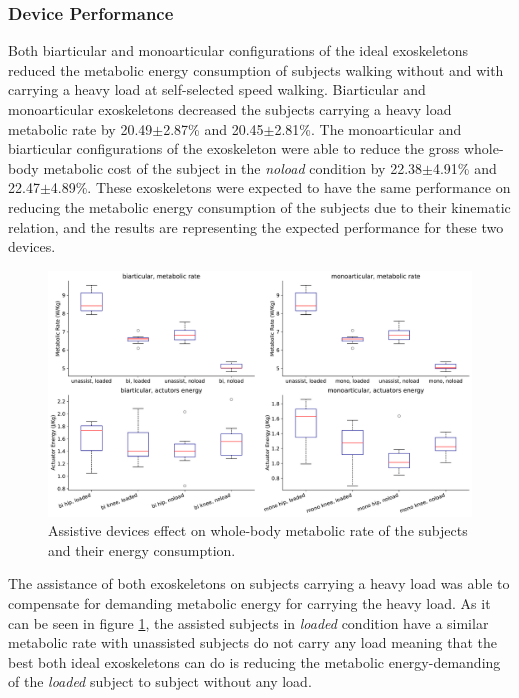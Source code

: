 \documentclass[10pt,letterpaper]{article}
\begin{document}
\subsubsection*{Device Performance}
Both biarticular and monoarticular configurations of the ideal exoskeletons reduced the metabolic energy consumption of subjects walking without and with carrying a heavy load at self-selected speed walking. Biarticular and monoarticular exoskeletons decreased the subjects carrying a heavy load metabolic rate by 20.49$\pm$2.87\% and 20.45$\pm$2.81\%. The monoarticular and biarticular configurations of the exoskeleton were able to reduce the gross whole-body metabolic cost of the subject in the \textit{noload} condition by 22.38$\pm$4.91\% and 22.47$\pm$4.89\%. These exoskeletons were expected to have the same performance on reducing the metabolic energy consumption of the subjects due to their kinematic relation, and the results are representing the expected performance for these two devices.\\
\begin{figure}[ht]   
	\centering
	\includegraphics[scale=0.35]{Ideal_Exo_MonovsBi_Figures/Paper_Figure_Energy_BoxPlot.pdf}
	\caption{Assistive devices effect on whole-body metabolic rate of the subjects and their energy consumption.}
	\label{Fig_IdealExo_Energy_BoxPlot}
\end{figure}
The assistance of both exoskeletons on subjects carrying a heavy load was able to compensate for demanding metabolic energy for carrying the heavy load. As it can be seen in figure \ref{Fig_IdealExo_Energy_BoxPlot}, the assisted subjects in \textit{loaded} condition have a similar metabolic rate with unassisted subjects do not carry any load meaning that the best both ideal exoskeletons can do is reducing the metabolic energy-demanding of the \textit{loaded} subject to subject without any load.\\
\end{document}
